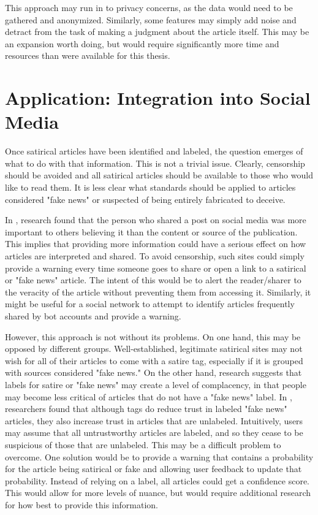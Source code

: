 \documentclass [12 pt] {report}
\begin{document}
This approach may run in to privacy concerns, as the data would need to be gathered and anonymized. Similarly, some features may simply add noise and detract from the task of making a judgment about the article itself. This may be an expansion worth doing, but would require significantly more time and resources than were available for this thesis.

\section{Application: Integration into Social Media}
Once satirical articles have been identified and labeled, the question emerges of what to do with that information. This is not a trivial issue. Clearly, censorship should be avoided and all satirical articles should be available to those who would like to read them. It is less clear what standards should be applied to articles considered "fake news" or suspected of being entirely fabricated to deceive.

In \cite{trust}, research found that the person who shared a post on social media was more important to others believing it than the content or source of the publication. This implies that providing more information could have a serious effect on how articles are interpreted and shared. To avoid censorship, such sites could simply provide a warning every time someone goes to share or open a link to a satirical or "fake news" article. The intent of this would be to alert the reader/sharer to the veracity of the article without preventing them from accessing it. Similarly, it might be useful for a social network to attempt to identify articles frequently shared by bot accounts and provide a warning. 

However, this approach is not without its problems. On one hand, this may be opposed by different groups. Well-established, legitimate satirical sites may not wish for all of their articles to come with a satire tag, especially if it is grouped with sources considered "fake news." On the other hand, research suggests that labels for satire or "fake news" may create a level of complacency, in that people may become less critical of articles that do not have a "fake news" label. In \cite{warnings}, researchers found that although tags do reduce trust in labeled "fake news" articles, they also increase trust in articles that are unlabeled. Intuitively, users may assume that all untrustworthy articles are labeled, and so they cease to be suspicious of those that are unlabeled. This may be a difficult problem to overcome. One solution would be to provide a warning that contains a probability for the article being satirical or fake and allowing user feedback to update that probability. Instead of relying on a label, all articles could get a confidence score. This would allow for more levels of nuance, but would require additional research for how best to provide this information.
\end{document}
